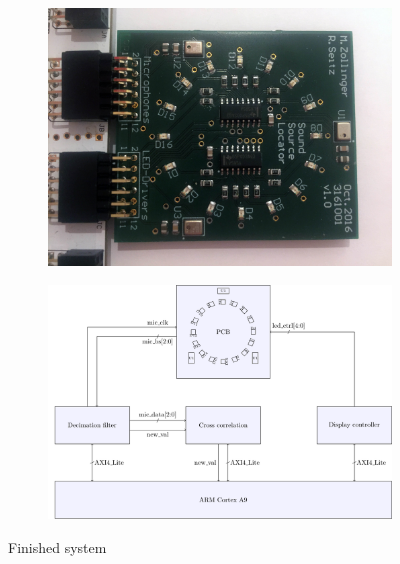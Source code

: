 
\usepackage{subcaption}


\maketitle
\setcounter{tocdepth}{2}

\begin{figure}[htbp]
	\begin{subfigure}{0.5\textwidth}
		\centering
		\includegraphics[scale=.4]{./block_diagram/pcb.jpg}
		\label{fig::pcb_view}
	\end{subfigure}
	\begin{subfigure}{0.5\textwidth}
		\centering
		\includegraphics[scale=.4]{./block_diagram/system_top.pdf}
		\label{fig::top_block}
	\end{subfigure}
	\caption{Finished system}
	\label{fig::system}
\end{figure}

 






